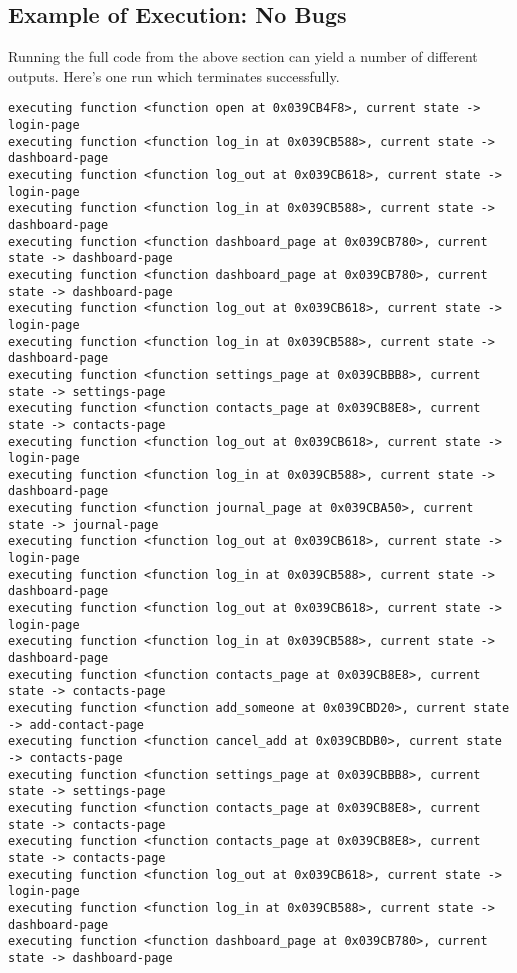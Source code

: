 \subsection{Example of Execution: No Bugs}
Running the full code from the above section can yield a number of different outputs. Here's one run which terminates successfully.
{
\begin{verbatim}
executing function <function open at 0x039CB4F8>, current state -> login-page
executing function <function log_in at 0x039CB588>, current state -> dashboard-page
executing function <function log_out at 0x039CB618>, current state -> login-page
executing function <function log_in at 0x039CB588>, current state -> dashboard-page
executing function <function dashboard_page at 0x039CB780>, current state -> dashboard-page
executing function <function dashboard_page at 0x039CB780>, current state -> dashboard-page
executing function <function log_out at 0x039CB618>, current state -> login-page
executing function <function log_in at 0x039CB588>, current state -> dashboard-page
executing function <function settings_page at 0x039CBBB8>, current state -> settings-page
executing function <function contacts_page at 0x039CB8E8>, current state -> contacts-page
executing function <function log_out at 0x039CB618>, current state -> login-page
executing function <function log_in at 0x039CB588>, current state -> dashboard-page
executing function <function journal_page at 0x039CBA50>, current state -> journal-page
executing function <function log_out at 0x039CB618>, current state -> login-page
executing function <function log_in at 0x039CB588>, current state -> dashboard-page
executing function <function log_out at 0x039CB618>, current state -> login-page
executing function <function log_in at 0x039CB588>, current state -> dashboard-page
executing function <function contacts_page at 0x039CB8E8>, current state -> contacts-page
executing function <function add_someone at 0x039CBD20>, current state -> add-contact-page
executing function <function cancel_add at 0x039CBDB0>, current state -> contacts-page
executing function <function settings_page at 0x039CBBB8>, current state -> settings-page
executing function <function contacts_page at 0x039CB8E8>, current state -> contacts-page
executing function <function contacts_page at 0x039CB8E8>, current state -> contacts-page
executing function <function log_out at 0x039CB618>, current state -> login-page
executing function <function log_in at 0x039CB588>, current state -> dashboard-page
executing function <function dashboard_page at 0x039CB780>, current state -> dashboard-page

\end{verbatim}}
